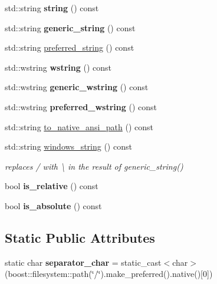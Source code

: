 \begin{DoxyCompactItemize}
std\+::string {\bfseries string} () const
\item 
\mbox{\label{classfc_1_1path_ab1eae2062df4ea01435348ec52fb3784}} 
std\+::string {\bfseries generic\+\_\+string} () const
\item 
std\+::string \mbox{\hyperlink{classfc_1_1path_a9708f850e21e668a29523fbe6c4d0dca}{preferred\+\_\+string}} () const
\item 
\mbox{\label{classfc_1_1path_a2eef878144c6265508787f3b9a6355e8}} 
std\+::wstring {\bfseries wstring} () const
\item 
\mbox{\label{classfc_1_1path_a018f35936535482432e303d4b7d10c31}} 
std\+::wstring {\bfseries generic\+\_\+wstring} () const
\item 
\mbox{\label{classfc_1_1path_a02b8088f909ec69bd18f1f2617cb1c1f}} 
std\+::wstring {\bfseries preferred\+\_\+wstring} () const
\item 
std\+::string \mbox{\hyperlink{classfc_1_1path_a9712c4ccfcfc54e02cc913510a858733}{to\+\_\+native\+\_\+ansi\+\_\+path}} () const
\item 
std\+::string \mbox{\hyperlink{classfc_1_1path_a12a75eca015d0c9880e2c062e371d08d}{windows\+\_\+string}} () const
\begin{DoxyCompactList}\small\item\em replaces \textquotesingle{}/\textquotesingle{} with \textquotesingle{}\textbackslash{}\textquotesingle{} in the result of generic\+\_\+string() \end{DoxyCompactList}\item 
\mbox{\label{classfc_1_1path_afbbbaae83c2d714a07cc424dc7b9f329}} 
bool {\bfseries is\+\_\+relative} () const
\item 
\mbox{\label{classfc_1_1path_ae8ca694b3a1a776ae4a3c7d4622d746a}} 
bool {\bfseries is\+\_\+absolute} () const
\end{DoxyCompactItemize}
\subsection*{Static Public Attributes}
\begin{DoxyCompactItemize}
\item 
\mbox{\label{classfc_1_1path_a613fc8b20159868e1aa62670d81a0aad}} 
static char {\bfseries separator\+\_\+char} = static\+\_\+cast$<$char$>$(boost\+::filesystem\+::path(\char`\"{}/\char`\"{}).make\+\_\+preferred().native()\mbox{[}0\mbox{]})
\end{DoxyCompactItemize}
